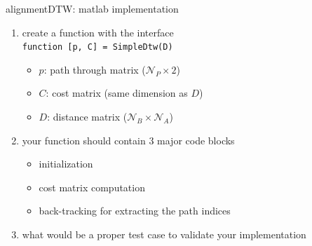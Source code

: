         \begin{frame}{alignment}{DTW: matlab implementation}
            
            \begin{enumerate}
                \item   create a function with the interface\\ \texttt{function [p, C] = SimpleDtw(D)}
                    \begin{itemize}
                        \item   $p$: path through matrix ($\mathcal{N}_P\times 2$)
                        \item   $C$: cost matrix (same dimension as $D$)
                        \item   $D$: distance matrix ($\mathcal{N}_B\times \mathcal{N}_A$)
                    \end{itemize}
                \item   your function should contain 3 major code blocks
                    \begin{itemize}
                        \item   initialization
                        \item   cost matrix computation
                        \item   back-tracking for extracting the path indices
                    \end{itemize}
                \item   what would be a proper test case to validate your implementation
            \end{enumerate}
        \end{frame}
